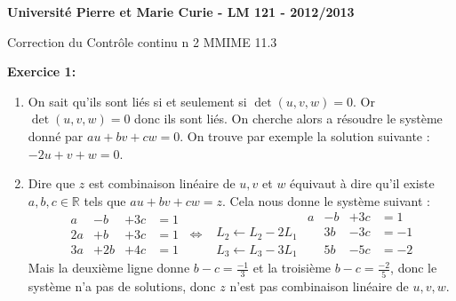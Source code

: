 \documentclass{article}
\newcommand{\R}{\mathbb{R}}
\begin{document}
\large
\noindent 
\textbf{Université Pierre et Marie Curie - LM 121 - 2012/2013}\\
\begin{center}
\Large 
Correction du Contrôle continu n 2 MMIME 11.3
\end{center}
\medskip
\noindent
\textbf{Exercice 1:}\\

\begin{enumerate}
\item 
On sait qu'ils sont liés si et seulement si 
$\det(u,v,w) = 0$.
Or $\det(u,v,w)=0$ donc ils sont liés. 
On cherche alors a résoudre le 
système donné par 
$au+bv+cw=0$. On trouve par exemple la solution suivante : \\
$-2u +v+w=0$.
\item 
Dire que $z$ est combinaison linéaire de $u,v$ et $w$ équivaut à dire qu'il existe 
$a,b,c \in \R $ tels que 
$au+bv+cw=z$. Cela nous donne le système suivant : 
\[ 
\begin{array}{cccc}
a&-b&+3c &=1\\
2a & +b &+3c &=1 \\
3a & +2b & +4c & =1
\end{array}
\ \Leftrightarrow \ \ 
\begin{array}{lcccc}
 & a&-b&+3c &=1\\
 L_2 \leftarrow L_2 -2L_1 &  & 3b & -3c & =-1 \\
 L_3 \leftarrow L_3-3L_1 & & 5b & -5c &=-2
\end{array}\]
Mais la deuxième ligne donne 
$b-c= \frac{-1}{3}$ et la troisième 
$b-c = \frac{-2}{5}$, donc le système n'a pas de solutions, donc $z$ n'est pas combinaison linéaire de 
$u,v,w$.
\end{enumerate}
\end{document}
